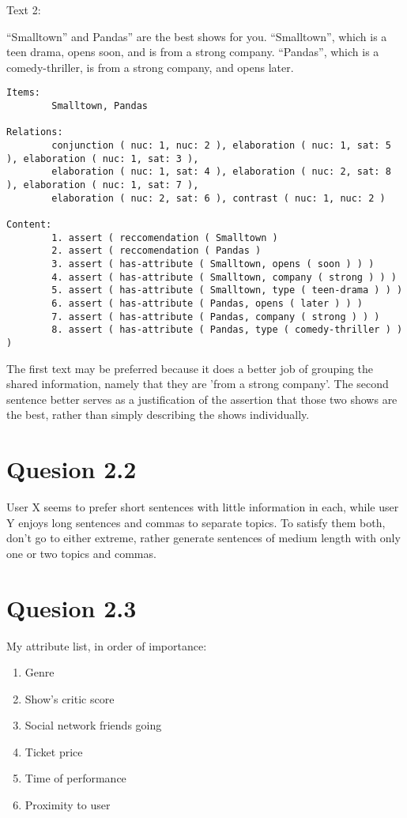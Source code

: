 \documentclass[a4paper,11pt,oneside]{article}
\begin{document}
Text 2:

“Smalltown” and Pandas” are the best shows for you. “Smalltown”, which is a teen drama, opens soon, and is from a strong company. “Pandas”, which is a comedy-thriller, is from a strong company, and opens later.
\begin{verbatim}
Items:
        Smalltown, Pandas

Relations:
        conjunction ( nuc: 1, nuc: 2 ), elaboration ( nuc: 1, sat: 5 ), elaboration ( nuc: 1, sat: 3 ),
        elaboration ( nuc: 1, sat: 4 ), elaboration ( nuc: 2, sat: 8 ), elaboration ( nuc: 1, sat: 7 ),
        elaboration ( nuc: 2, sat: 6 ), contrast ( nuc: 1, nuc: 2 )
        
Content:
        1. assert ( reccomendation ( Smalltown )
        2. assert ( reccomendation ( Pandas )
        3. assert ( has-attribute ( Smalltown, opens ( soon ) ) )
        4. assert ( has-attribute ( Smalltown, company ( strong ) ) )
        5. assert ( has-attribute ( Smalltown, type ( teen-drama ) ) )
        6. assert ( has-attribute ( Pandas, opens ( later ) ) )
        7. assert ( has-attribute ( Pandas, company ( strong ) ) )
        8. assert ( has-attribute ( Pandas, type ( comedy-thriller ) ) )

\end{verbatim}

The first text may be preferred because it does a better job of grouping the shared information, namely that they are 'from a strong company'. The second sentence better serves as a justification of the assertion that those two shows are the best, rather than simply describing the shows individually.

\section{Quesion 2.2}
User X seems to prefer short sentences with little information in each, while user Y enjoys long sentences and commas to separate topics. To satisfy them both, don't go to either extreme, rather generate sentences of medium length with only one or two topics and commas.

\section{Quesion 2.3}
My attribute list, in order of importance:
\begin{enumerate}
\item Genre
\item Show's critic score
\item Social network friends going
\item Ticket price
\item Time of performance
\item Proximity to user
\end{enumerate}
\end{document}
